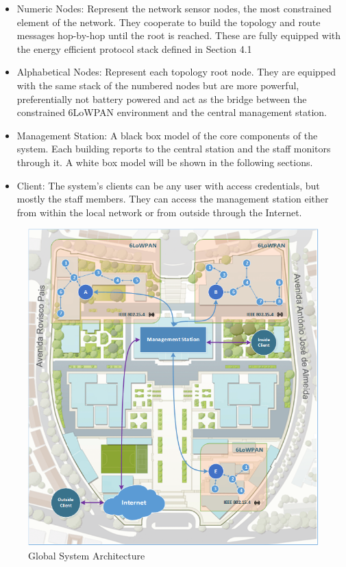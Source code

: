 \begin{itemize}
	\item Numeric Nodes: Represent the network sensor nodes, the most constrained element of the network. They cooperate to build the topology and route messages hop-by-hop until the root is reached. These are fully equipped with the energy efficient protocol stack defined in Section 4.1\\
	\item Alphabetical Nodes: Represent each topology root node. They are equipped with the same stack of the numbered nodes but are more powerful, preferentially not battery powered and act as the bridge between the constrained 6LoWPAN environment and the central management station. \\
	\item Management Station: A black box model of the core components of the system. Each building reports to the central station and the staff monitors through it. A white box model will be shown in the following sections.\\
	\item Client: The system's clients can be any user with access credentials, but mostly the staff members. They can access the management station either from within the local network or from outside through the Internet.\\
\end{itemize}
 
\begin{figure}[h]
  \centering
  \includegraphics[width=0.8\linewidth]{figures/Global_Architecture.png}
  \caption{Global System Architecture}
  \label{fig:global_architecture}
\end{figure}

